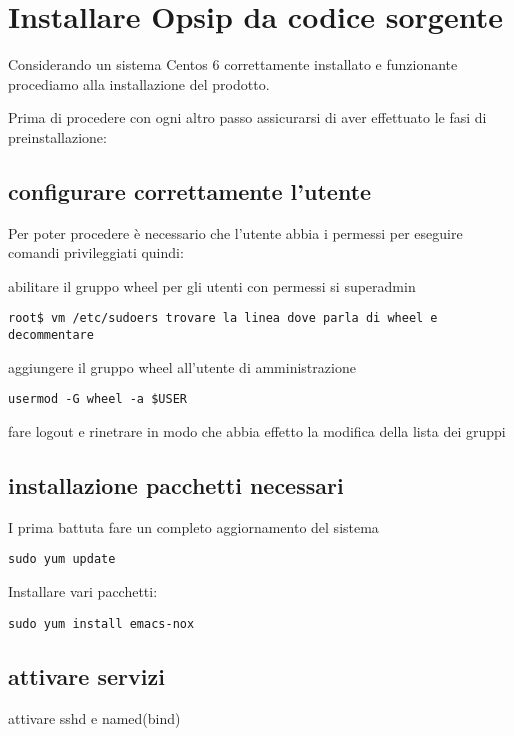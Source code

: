 \section{Installare Opsip da codice sorgente}

Considerando un sistema Centos \textsuperscript{\textregistered} 6 correttamente installato e funzionante procediamo alla installazione del prodotto.

Prima di procedere con ogni altro passo assicurarsi di aver effettuato le fasi di preinstallazione:

\subsection{configurare correttamente l'utente}

Per poter procedere \`e necessario che l'utente abbia i permessi per eseguire comandi privileggiati quindi:

abilitare il gruppo wheel per gli utenti con permessi si superadmin 

\begin{verbatim}
root$ vm /etc/sudoers trovare la linea dove parla di wheel e decommentare
\end{verbatim}

aggiungere il gruppo wheel all'utente di amministrazione 

\begin{verbatim}
usermod -G wheel -a $USER
\end{verbatim}

fare logout e rinetrare in modo che abbia effetto la modifica della lista dei gruppi

\subsection{installazione pacchetti necessari}

I prima battuta fare un completo aggiornamento del sistema

\begin{verbatim}
sudo yum update
\end{verbatim}

Installare vari pacchetti:
\begin{verbatim}
sudo yum install emacs-nox 
\end{verbatim}

\subsection{attivare servizi}
attivare sshd e named(bind)

